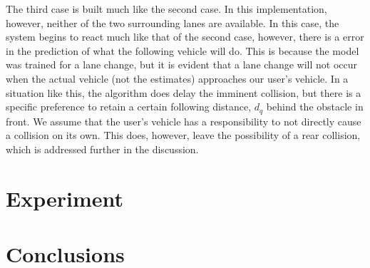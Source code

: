 \documentclass[letterpaper, 10 pt, conference]{ieeeconf}  %
\begin{document}
The third case is built much like the second case. In this implementation, however, neither of the two surrounding lanes are available. In this case, the system begins to react much like that of the second case, however, there is a error in the prediction of what the following vehicle will do. This is because the model was trained for a lane change, but it is evident that a lane change will not occur when the actual vehicle (not the estimates) approaches our user's vehicle. In a situation like this, the algorithm does delay the imminent collision, but there is a specific preference to retain a certain following distance, $d_q$ behind the obstacle in front. We assume that the user's vehicle has a responsibility to not directly cause a collision on its own. This does, however, leave the possibility of a rear collision, which is addressed further in the discussion.


\section{Experiment} \label{sec:exps}
\section{Conclusions} \label{sec:concs}

\newpage

%
%
%


  
  





\end{document}
